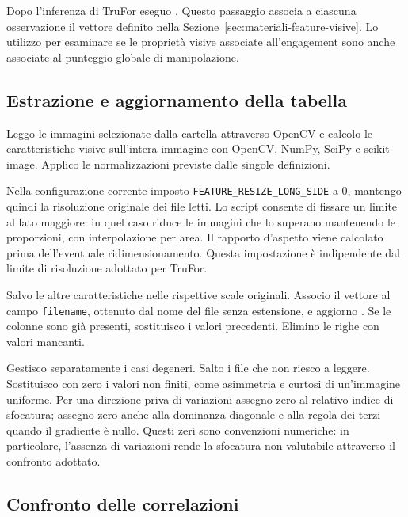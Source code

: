 Dopo l'inferenza di TruFor eseguo . Questo passaggio associa a ciascuna osservazione il vettore definito nella Sezione~\ref{sec:materiali-feature-visive}. Lo utilizzo per esaminare se le proprietà visive associate all'engagement sono anche associate al punteggio globale di manipolazione.

\subsection{Estrazione e aggiornamento della tabella}
\label{subsec:metodi-feature-estrazione}

Leggo le immagini selezionate dalla cartella  attraverso OpenCV e calcolo le caratteristiche visive sull'intera immagine con OpenCV, NumPy, SciPy e scikit-image. Applico le normalizzazioni previste dalle singole definizioni. 

Nella configurazione corrente imposto \texttt{FEATURE\_RESIZE\_LONG\_SIDE} a 0, mantengo quindi la risoluzione originale dei file letti. Lo script consente di fissare un limite al lato maggiore: in quel caso riduce le immagini che lo superano mantenendo le proporzioni, con interpolazione per area. Il rapporto d'aspetto viene calcolato prima dell'eventuale ridimensionamento. Questa impostazione è indipendente dal limite di risoluzione adottato per TruFor.

Salvo le altre caratteristiche nelle rispettive scale originali. Associo il vettore al campo \texttt{filename}, ottenuto dal nome del file senza estensione, e aggiorno . Se le colonne sono già presenti, sostituisco i valori precedenti. Elimino le righe con valori mancanti.

Gestisco separatamente i casi degeneri. Salto i file che non riesco a leggere. Sostituisco con zero i valori non finiti, come asimmetria e curtosi di un'immagine uniforme. Per una direzione priva di variazioni assegno zero al relativo indice di sfocatura; assegno zero anche alla dominanza diagonale e alla regola dei terzi quando il gradiente è nullo. Questi zeri sono convenzioni numeriche: in particolare, l'assenza di variazioni rende la sfocatura non valutabile attraverso il confronto adottato.

\subsection{Confronto delle correlazioni}
\label{subsec:metodi-feature-correlazioni}

